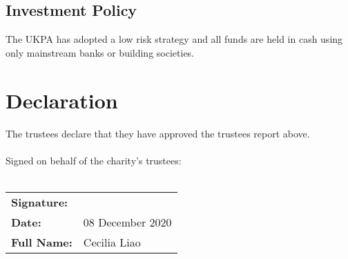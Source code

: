 \documentclass[11pt, final]{article}
\begin{document}
        \subsection{Investment Policy}
        The UKPA has adopted a low risk strategy and all funds are held in cash using only mainstream banks or building societies.

    \section{Declaration}
    The trustees declare that they have approved the trustees report above.\\
    \\
    Signed on behalf of the charity's trustees:\\
    \\
    \begin{tabular}{l l}
        \textbf{Signature:}\vspace{2cm}\\
        \textbf{Date:} & 08 December 2020\vspace{1cm}\\
        \textbf{Full Name:} & Cecilia Liao \\
    \end{tabular}
\end{document}
